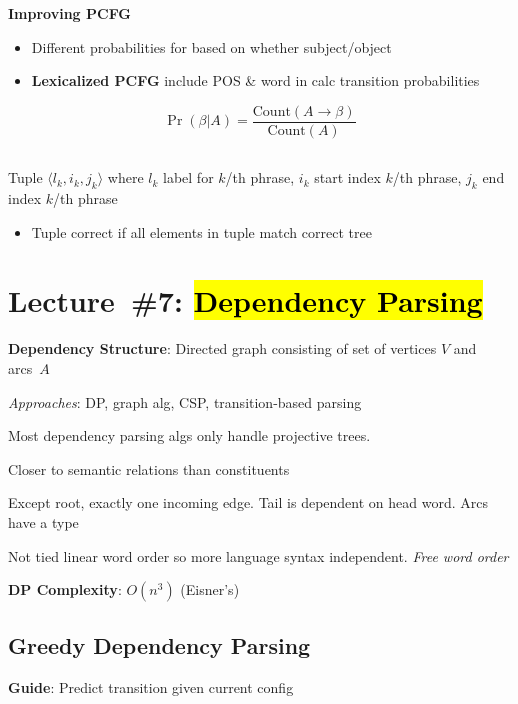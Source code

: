 \documentclass[8pt]{extarticle}
\renewcommand{\green}[1]{{\color{ForestGreen} #1}}
\newcommand{\greenbf}[1]{\textbf{\green{#1}}}
\begin{document}
\begin{multicols}{3}
  \textbf{Improving PCFG}
  \begin{itemize}
    \item Different probabilities for based on whether subject/object
    \item \greenbf{Lexicalized PCFG} include POS \& word in calc transition probabilities
  \end{itemize}
  \begin{equation*}
    \Pr(\beta \vert A) = \frac{\text{Count}(A \rightarrow \beta)}{\text{Count}(A)}
  \end{equation*}

  \subsection*{}

  Tuple ${\langle l_k, i_k, j_k  \rangle}$ where $l_k$ label for $k$\-/th phrase, $i_k$ start index $k$\-/th phrase, $j_k$ end index $k$\-/th phrase
  \begin{itemize}
    \item Tuple correct if all elements in tuple match correct tree
  \end{itemize}

  \section*{Lecture~\#7: \hl{Dependency Parsing}}

  \greenbf{Dependency Structure}: Directed graph consisting of set of vertices $V$ and arcs~$A$

  \textit{Approaches}: DP, graph alg, CSP, transition-based parsing

  Most dependency parsing algs only handle projective trees.

  Closer to semantic relations than constituents

  Except root, exactly one incoming edge. Tail is dependent on head word. Arcs have a type

  Not tied linear word order so more language syntax independent. \textit{Free word order}

  \textbf{DP Complexity}: $O(n^3)$ (Eisner's)

  \subsection*{Greedy Dependency Parsing}

  \greenbf{Guide}: Predict transition given current config


\end{multicols}
\end{document}
